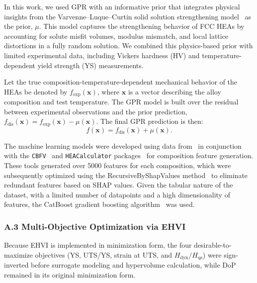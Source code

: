 In this work, we used GPR with an informative prior that integrates physical insights from the Varvenne--Luque--Curtin solid solution strengthening model~\cite{varvenne2016theory} as the prior, $\mu$. This model captures the strengthening behavior of FCC HEAs by accounting for solute misfit volumes, modulus mismatch, and local lattice distortions in a fully random solution. We combined this physics-based prior with limited experimental data, including Vickers hardness (HV) and temperature-dependent yield strength (YS) measurements.

Let the true composition-temperature-dependent mechanical behavior of the HEAs be denoted by $f_{\textrm{exp}}(\mathbf{x})$, where $\mathbf{x}$ is a vector describing the alloy composition and test temperature. The GPR model is built over the residual between experimental observations and the prior prediction, $f_{\textrm{dis}}(\mathbf{x}) = f_{\textrm{exp}}(\mathbf{x}) - \mu(\mathbf{x})$. The final GPR prediction is then:
\[
f(\mathbf{x}) = f_{\textrm{dis}}(\mathbf{x}) + \mu(\mathbf{x}).
\]

The machine learning models were developed using data from~\cite{hastings2025accelerated} in conjunction with the {\tt CBFV}~\cite{Murdock2020IsProperties} and {\tt HEACalculator} packages~\cite{doguhan_sariturk_2022_7429046} for composition feature generation. These tools generated over 5000 features for each composition, which were subsequently optimized using the RecursiveByShapValues method~\cite{Prokhorenkova2018CatBoost:Features} to eliminate redundant features based on SHAP values. Given the tabular nature of the dataset, with a limited number of datapoints and a high dimensionality of features, the CatBoost gradient boosting algorithm~\cite{Prokhorenkova2018CatBoost:Features} was used.

\subsubsection*{A.3 Multi-Objective Optimization via EHVI}

Because EHVI is implemented in minimization form, the four desirable-to-maximize objectives (YS, UTS/YS, strain at UTS, and $H_\text{dyn}/H_\text{qs}$) were sign-inverted before surrogate modeling and hypervolume calculation, while DoP remained in its original minimization form.

